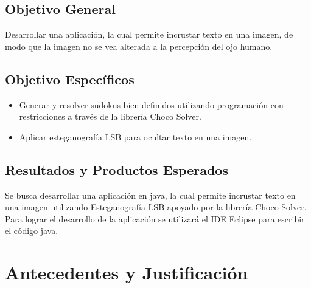 \documentclass[14pt]{article}
\begin{document}
	\subsection{Objetivo General}

Desarrollar una aplicación, la cual permite incrustar texto en una imagen, de modo que la imagen no se vea alterada a la percepción del ojo humano.

	\subsection{Objetivo Específicos}
\begin{itemize}
	\item Generar y resolver sudokus bien definidos utilizando programación con restricciones a través de la librería Choco Solver.
	
	\item Aplicar esteganografía LSB para ocultar texto en una imagen.
	
\end{itemize}
	\subsection{Resultados y Productos Esperados}
Se busca desarrollar una aplicación en java, la cual permite incrustar texto en una imagen utilizando Esteganografía LSB apoyado por la librería Choco Solver.
Para lograr el desarrollo de la aplicación se utilizará el IDE Eclipse para escribir el código java.

\newpage
	\section{Antecedentes y Justificación}
\end{document}
